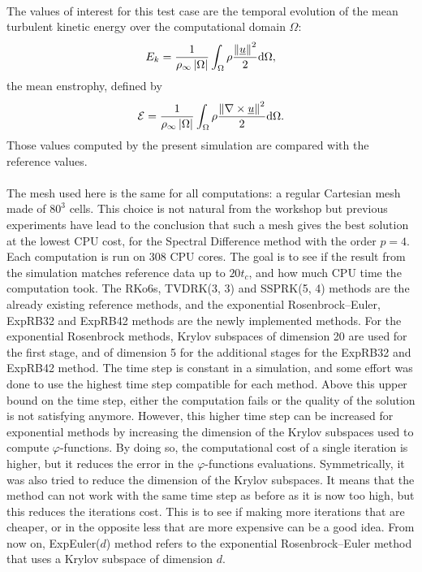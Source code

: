       \paragraph{}
      The values of interest for this test case are the temporal evolution of the mean turbulent kinetic energy over the computational domain $\Omega$:
      \begin{equation}
        E_k = \frac{1}{\rho_\infty \left|\Omega\right|} \int_\Omega \rho \frac{\norm{\vec{u}}^2}{2} \mathrm{d}\Omega ,
      \end{equation}
      the mean enstrophy, defined by
      \begin{equation}
        \mathcal{E} = \frac{1}{\rho_\infty \left|\Omega\right|} \int_\Omega \rho \frac{\norm{\nabla \times \vec{u}}^2}{2} \mathrm{d}\Omega .
      \end{equation}
      Those values computed by the present simulation are compared with the reference values.

      \paragraph{}
      The mesh used here is the same for all computations: a regular Cartesian mesh made of $80^3$ cells.
      This choice is not natural from the workshop but previous experiments have lead to the conclusion that such a mesh gives the best solution at the lowest CPU cost, for the Spectral Difference method with the order $p = 4$.
      Each computation is run on 308 CPU cores.
      The goal is to see if the result from the simulation matches reference data up to $20 t_c$, and how much CPU time the computation took.
      The RKo6s, TVDRK(3, 3) and SSPRK(5, 4) methods are the already existing reference methods, and the exponential Rosenbrock--Euler, ExpRB32 and ExpRB42 methods are the newly implemented methods.
      For the exponential Rosenbrock methods, Krylov subspaces of dimension 20 are used for the first stage, and of dimension 5 for the additional stages for the ExpRB32 and ExpRB42 method.
      The time step is constant in a simulation, and some effort was done to use the highest time step compatible for each method.
      Above this upper bound on the time step, either the computation fails or the quality of the solution is not satisfying anymore.
      However, this higher time step can be increased for exponential methods by increasing the dimension of the Krylov subspaces used to compute $\varphi$-functions.
      By doing so, the computational cost of a single iteration is higher, but it reduces the error in the $\varphi$-functions evaluations.
      Symmetrically, it was also tried to reduce the dimension of the Krylov subspaces.
      It means that the method can not work with the same time step as before as it is now too high, but this reduces the iterations cost.
      This is to see if making more iterations that are cheaper, or in the opposite less that are more expensive can be a good idea.
      From now on, ExpEuler($d$) method refers to the exponential Rosenbrock--Euler method that uses a Krylov subspace of dimension $d$.

